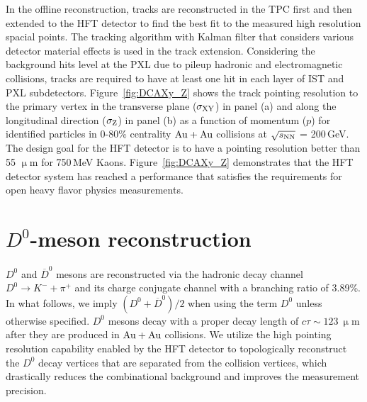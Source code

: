 \documentclass[%
 reprint,	
 amsmath,amssymb,
 aps,
 prc,
]{revtex4-1}
\begin{document}
In the offline reconstruction, tracks are reconstructed in the TPC first and then extended to the HFT detector to find the best fit to the measured high resolution spacial points. The tracking algorithm with Kalman filter that considers various detector material effects is used in the track extension. Considering the background hits level at the PXL due to pileup hadronic and electromagnetic collisions, tracks are required to have at least one hit in each layer of IST and PXL subdetectors. Figure~\ref{fig:DCAXy_Z} shows the track pointing resolution to the primary vertex in the transverse plane ($\sigma_{\rm XY}$) in panel (a) and along the longitudinal direction ($\sigma_{\rm Z}$) in panel (b) as a function of momentum ($p$) for identified particles in 0-80\% centrality ${\rm{Au + Au}}$ collisions at $\sqrt{s_{\rm NN}}$ = 200\,GeV. The design goal for the HFT detector is to have a pointing resolution better than 55 $\upmu$m for 750\,MeV Kaons. Figure~\ref{fig:DCAXy_Z} demonstrates that the HFT detector system has reached a performance that satisfies the requirements for open heavy flavor physics measurements.


\section{\label{sec:D0recon}$D^0$-meson reconstruction}

$D^0$ and $\overline{D}^{0}$ mesons are reconstructed via the hadronic decay channel $D^0\rightarrow K^-+\pi^+$ and its charge conjugate channel with a branching ratio of 3.89\%. In what follows, we imply $(D^0 +\overline{D}^{0})/2$ when using the term $D^0$ unless otherwise specified. $D^0$ mesons decay with a proper decay length of $c\tau\sim123\ \upmu$m after they are produced in ${\rm{Au + Au}}$ collisions. We utilize the high pointing resolution capability enabled by the HFT detector to topologically reconstruct the $D^0$ decay vertices that are separated from the collision vertices, which drastically reduces the combinational background and improves the measurement precision.
\end{document}

